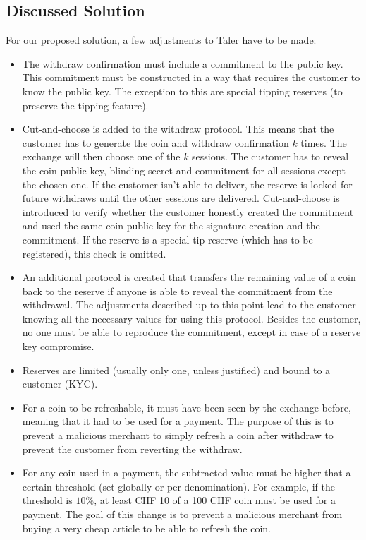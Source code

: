\subsection{Discussed Solution}
For our proposed solution, a few adjustments to Taler have to be made:
\begin{itemize}
    \item The withdraw confirmation must include a commitment to the public key.
    This commitment must be constructed in a way that requires the customer to know the public key.
    The exception to this are special tipping reserves (to preserve the tipping feature).
    \item Cut-and-choose is added to the withdraw protocol.
    This means that the customer has to generate the coin and withdraw confirmation $ k $ times.
    The exchange will then choose one of the $ k $ sessions.
    The customer has to reveal the coin public key, blinding secret and commitment for all sessions except the chosen one.
    If the customer isn't able to deliver, the reserve is locked for future withdraws until the other sessions are delivered.
    Cut-and-choose is introduced to verify whether the customer honestly created the commitment and used the same coin public key for the signature creation and the commitment.
    If the reserve is a special tip reserve (which has to be registered), this check is omitted.
    \item An additional protocol is created that transfers the remaining value of a coin back to the reserve if anyone is able to reveal the commitment from the withdrawal.
    The adjustments described up to this point lead to the customer knowing all the necessary values for using this protocol.
    Besides the customer, no one must be able to reproduce the commitment, except in case of a reserve key compromise.
    \item Reserves are limited (usually only one, unless justified) and bound to a customer (KYC).
    \item For a coin to be refreshable, it must have been seen by the exchange before, meaning that it had to be used for a payment.
    The purpose of this is to prevent a malicious merchant to simply refresh a coin after withdraw to prevent the customer from reverting the withdraw.
    \item For any coin used in a payment, the subtracted value must be higher that a certain threshold (set globally or per denomination).
    For example, if the threshold is $ 10\% $, at least CHF 10 of a 100 CHF coin must be used for a payment.
    The goal of this change is to prevent a malicious merchant from buying a very cheap article to be able to refresh the coin.
\end{itemize}

